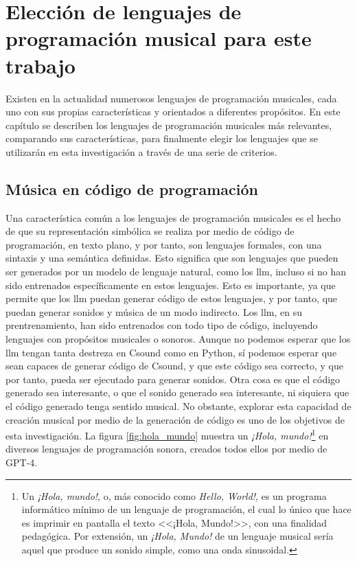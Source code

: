 \chapter{Elección de lenguajes de programación musical para este trabajo}


Existen en la actualidad numerosos lenguajes de programación musicales, cada uno con sus propias características y orientados a diferentes propósitos. En este capítulo se describen los lenguajes de programación musicales más relevantes, comparando sus características, para finalmente elegir los lenguajes que se utilizarán en esta investigación a través de una serie de criterios.

\section{Música en código de programación}

Una característica común a los lenguajes de programación musicales es el hecho de que su representación simbólica se realiza por medio de código de programación, en texto plano, y por tanto, son lenguajes formales, con una sintaxis y una semántica definidas. Esto significa que son lenguajes que pueden ser generados por un modelo de lenguaje natural, como los \gls{llm}, incluso si no han sido entrenados específicamente en estos lenguajes. Esto es importante, ya que permite que los \gls{llm} puedan generar código de estos lenguajes, y por tanto, que puedan generar sonidos y música de un modo indirecto. Los \gls{llm}, en su prentrenamiento, han sido entrenados con todo tipo de código, incluyendo lenguajes con propósitos musicales o sonoros. Aunque no podemos esperar que los \gls{llm} tengan tanta destreza en Csound como en Python, sí podemos esperar que sean capaces de generar código de Csound, y que este código sea correcto, y que por tanto, pueda ser ejecutado para generar sonidos. Otra cosa es que el código generado sea interesante, o que el sonido generado sea interesante, ni siquiera que el código generado tenga sentido musical. No obstante, explorar esta capacidad de creación musical por medio de la generación de código es uno de los objetivos de esta investigación. La figura \ref{fig:hola_mundo} muestra un \emph{¡Hola, mundo!}\footnote{Un \emph{¡Hola, mundo!}, o, más conocido como \emph{Hello, World!}, es un programa informático mínimo de un lenguaje de programación, el cual lo único que hace es imprimir en pantalla el texto <<¡Hola, Mundo!>>, con una finalidad pedagógica. Por extensión, un \emph{¡Hola, Mundo!} de un lenguaje musical sería aquel que produce un sonido simple, como una onda sinusoidal.} en diversos lenguajes de programación sonora, creados todos ellos por medio de GPT-4.

